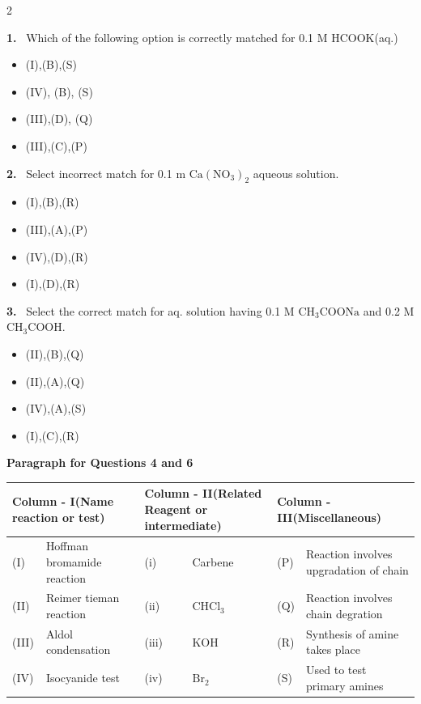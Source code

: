 \documentclass[10pt]{extarticle}
\newcommand{\qn}[1]{\par\smallskip\noindent\textbf{#1.}~}
\newcommand{\paraq}[2]{\par\smallskip\noindent\textbf{Paragraph for Questions #1 and #2}\par}
\newenvironment{qoptions}{\begin{itemize}[leftmargin=1.8em,itemsep=1pt,topsep=2pt,label={}]}{\end{itemize}}
\newcommand{\opt}[2]{\item[(#1)] #2}
\begin{document}
\begin{multicols}{2}
\qn{1} Which of the following option is correctly matched for 0.1 M HCOOK(aq.)
\begin{qoptions}
\opt{A}{(I),(B),(S)}
\opt{B}{(IV), (B), (S)}
\opt{C}{(III),(D), (Q)}
\opt{D}{(III),(C),(P)}
\end{qoptions}
\qn{2} Select incorrect match for 0.1 m $\mathrm{Ca(NO_3)_2}$ aqueous solution.
\begin{qoptions}
\opt{A}{(I),(B),(R)}
\opt{B}{(III),(A),(P)}
\opt{C}{(IV),(D),(R)}
\opt{D}{(I),(D),(R)}
\end{qoptions}
\qn{3} Select the correct match for aq. solution having 0.1 M $\mathrm{CH_3COONa}$ and 0.2 M $\mathrm{CH_3COOH}$.
\begin{qoptions}
\opt{A}{(II),(B),(Q)}
\opt{B}{(II),(A),(Q)}
\opt{C}{(IV),(A),(S)}
\opt{D}{(I),(C),(R)}
\end{qoptions}
\paraq{4}{6}
\end{multicols}
\begin{center}\small\setlength{\tabcolsep}{4pt}
\begin{tabular}{|p{0.9cm}|p{4.2cm}|p{0.9cm}|p{3.6cm}|p{0.9cm}|p{4.6cm}|}\hline
\multicolumn{2}{|p{\dimexpr 5.1cm+2\tabcolsep\relax}|}{\centering \textbf{Column - I}\newline\textbf{(Name reaction or test)}} & \multicolumn{2}{p{\dimexpr 4.5cm+2\tabcolsep\relax}|}{\centering \textbf{Column - II}\newline\textbf{(Related Reagent or intermediate)}} & \multicolumn{2}{p{\dimexpr 5.5cm+2\tabcolsep\relax}|}{\centering \textbf{Column - III}\newline\textbf{(Miscellaneous)}}\\\hline
(I) & Hoffman bromamide reaction & (i) & Carbene & (P) & Reaction involves upgradation of chain\\\hline
(II) & Reimer tieman reaction & (ii) & $\mathrm{CHCl_3}$ & (Q) & Reaction involves chain degration\\\hline
(III) & Aldol condensation & (iii) & KOH & (R) & Synthesis of amine takes place\\\hline
(IV) & Isocyanide test & (iv) & $\mathrm{Br_2}$ & (S) & Used to test primary amines\\\hline
\end{tabular}
\end{center}
\end{document}
